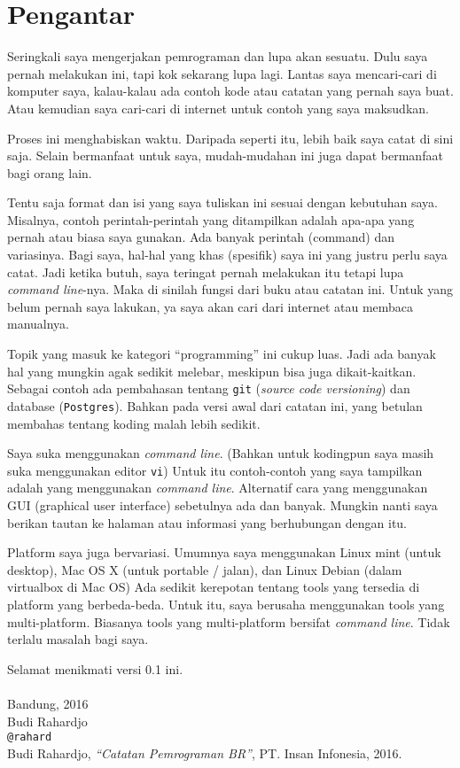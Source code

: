 \chapter*{Pengantar}

Seringkali saya mengerjakan pemrograman dan lupa akan sesuatu.
Dulu saya pernah melakukan ini, tapi kok sekarang lupa lagi.
Lantas saya mencari-cari di komputer saya, kalau-kalau ada contoh
kode atau catatan yang pernah saya buat.
Atau kemudian saya cari-cari di internet untuk contoh yang saya maksudkan.

Proses ini menghabiskan waktu.
Daripada seperti itu, lebih baik saya catat di sini saja.
Selain bermanfaat untuk saya, mudah-mudahan ini juga dapat bermanfaat
bagi orang lain.

Tentu saja format dan isi yang saya tuliskan ini sesuai dengan kebutuhan
saya. Misalnya, contoh perintah-perintah yang ditampilkan adalah apa-apa
yang pernah atau biasa saya gunakan.
Ada banyak perintah (command) dan variasinya.
Bagi saya, hal-hal yang khas (spesifik) saya ini yang justru perlu saya
catat. Jadi ketika butuh, saya teringat pernah melakukan itu tetapi
lupa {\em command line}-nya. Maka di sinilah fungsi dari buku atau
catatan ini. Untuk yang belum pernah saya lakukan, ya saya akan cari
dari internet atau membaca manualnya.

Topik yang masuk ke kategori ``programming'' ini cukup luas.
Jadi ada banyak hal yang mungkin agak sedikit melebar, meskipun
bisa juga dikait-kaitkan.
Sebagai contoh ada pembahasan tentang \texttt{git} 
({\em source code versioning}) dan database (\texttt{Postgres}).
Bahkan pada versi awal dari catatan ini, yang betulan membahas
tentang koding malah lebih sedikit.

Saya suka menggunakan {\em command line}. 
(Bahkan untuk kodingpun saya masih suka menggunakan editor \texttt{vi})
Untuk itu contoh-contoh yang saya tampilkan adalah yang menggunakan
{\em command line}.
Alternatif cara yang menggunakan GUI (graphical user interface)
sebetulnya ada dan banyak. Mungkin nanti saya berikan tautan
ke halaman atau informasi yang berhubungan dengan itu.

Platform saya juga bervariasi. Umumnya saya menggunakan
Linux mint (untuk desktop), Mac OS X (untuk portable / jalan), dan
Linux Debian (dalam virtualbox di Mac OS)
Ada sedikit kerepotan tentang tools yang tersedia di platform
yang berbeda-beda.
Untuk itu, saya berusaha menggunakan tools yang multi-platform.
Biasanya tools yang multi-platform bersifat {\em command line}.
Tidak terlalu masalah bagi saya.

Selamat menikmati versi 0.1 ini.\\
\\
Bandung, 2016\\
Budi Rahardjo\\
\texttt{@rahard}\\
Budi Rahardjo, {\em ``Catatan Pemrograman BR''}, PT. Insan Infonesia, 2016.

